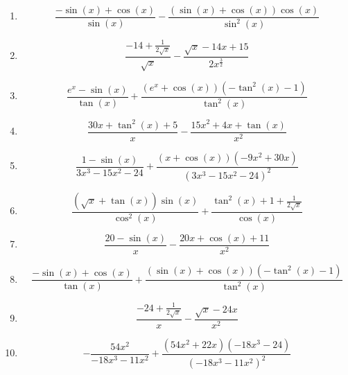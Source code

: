 \documentclass{article}
\begin{document}
        \begin{enumerate}
        \item$$\frac{- \sin{\left(x \right)} + \cos{\left(x \right)}}{\sin{\left(x \right)}} - \frac{\left(\sin{\left(x \right)} + \cos{\left(x \right)}\right) \cos{\left(x \right)}}{\sin^{2}{\left(x \right)}}$$
\item$$\frac{-14 + \frac{1}{2 \sqrt{x}}}{\sqrt{x}} - \frac{\sqrt{x} - 14 x + 15}{2 x^{\frac{3}{2}}}$$
\item$$\frac{e^{x} - \sin{\left(x \right)}}{\tan{\left(x \right)}} + \frac{\left(e^{x} + \cos{\left(x \right)}\right) \left(- \tan^{2}{\left(x \right)} - 1\right)}{\tan^{2}{\left(x \right)}}$$
\item$$\frac{30 x + \tan^{2}{\left(x \right)} + 5}{x} - \frac{15 x^{2} + 4 x + \tan{\left(x \right)}}{x^{2}}$$
\item$$\frac{1 - \sin{\left(x \right)}}{3 x^{3} - 15 x^{2} - 24} + \frac{\left(x + \cos{\left(x \right)}\right) \left(- 9 x^{2} + 30 x\right)}{\left(3 x^{3} - 15 x^{2} - 24\right)^{2}}$$
\item$$\frac{\left(\sqrt{x} + \tan{\left(x \right)}\right) \sin{\left(x \right)}}{\cos^{2}{\left(x \right)}} + \frac{\tan^{2}{\left(x \right)} + 1 + \frac{1}{2 \sqrt{x}}}{\cos{\left(x \right)}}$$
\item$$\frac{20 - \sin{\left(x \right)}}{x} - \frac{20 x + \cos{\left(x \right)} + 11}{x^{2}}$$
\item$$\frac{- \sin{\left(x \right)} + \cos{\left(x \right)}}{\tan{\left(x \right)}} + \frac{\left(\sin{\left(x \right)} + \cos{\left(x \right)}\right) \left(- \tan^{2}{\left(x \right)} - 1\right)}{\tan^{2}{\left(x \right)}}$$
\item$$\frac{-24 + \frac{1}{2 \sqrt{x}}}{x} - \frac{\sqrt{x} - 24 x}{x^{2}}$$
\item$$- \frac{54 x^{2}}{- 18 x^{3} - 11 x^{2}} + \frac{\left(54 x^{2} + 22 x\right) \left(- 18 x^{3} - 24\right)}{\left(- 18 x^{3} - 11 x^{2}\right)^{2}}$$
        \end{enumerate}
        

    
\end{document}

